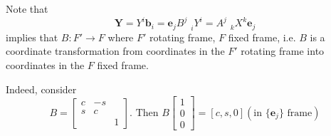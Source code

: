\documentclass[10pt]{amsart}
\begin{document}
\begin{multicols*}{2}
Note that 
\begin{equation}
	\mathbf{Y} = Y^i \mathbf{b}_i = \mathbf{e}_j B^j_{\quad i} Y^i = A^j_{\quad k} X^k \mathbf{e}_j 
\end{equation}
implies that $B: F' \to F$ where $F'$ rotating frame, $F$ fixed frame, i.e. $B$ is a coordinate transformation from coordinates in the $F'$ rotating frame into coordinates in the $F$ fixed frame.

Indeed, consider 
\[
B = \left[ \begin{matrix} c & -s & \\ s & c & \\ & & 1 \end{matrix} \right]. \text{ Then } B \left[ \begin{matrix} 1 \\ 0 \\ 0 \end{matrix} \right] = [c, s, 0] (\text{in $\lbrace \mathbf{e}_j \rbrace$ frame})
\]






\end{multicols*}
\end{document}
